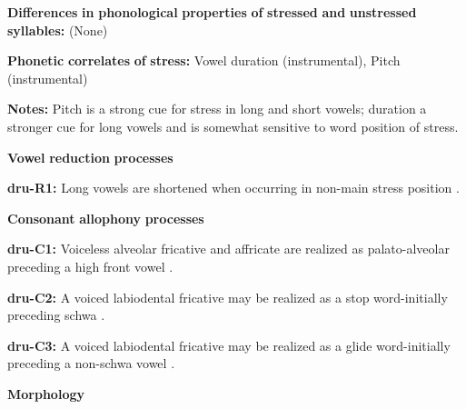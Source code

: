 \documentclass[output=paper]{langsci/langscibook}
\begin{document}
\begin{styleBody}
\textbf{Differences} \textbf{in} \textbf{phonological} \textbf{properties} \textbf{of} \textbf{stressed} \textbf{and} \textbf{unstressed} \textbf{syllables:} (None)
\end{styleBody}

\begin{styleBody}
\textbf{Phonetic} \textbf{correlates} \textbf{of} \textbf{stress:} Vowel duration (instrumental), Pitch (instrumental)
\end{styleBody}

\begin{styleBody}
\textbf{Notes:} Pitch is a strong cue for stress in long and short vowels; duration a stronger cue for long vowels and is somewhat sensitive to word position of stress.
\end{styleBody}

\begin{styleBody}
\textbf{Vowel} \textbf{reduction} \textbf{processes}
\end{styleBody}

\begin{styleBody}
\textbf{dru-R1:} Long vowels are shortened when occurring in non-main stress position \citep[257]{Chen2006}.
\end{styleBody}

\begin{styleBody}
\textbf{Consonant} \textbf{allophony} \textbf{processes}
\end{styleBody}

\begin{styleBody}
\textbf{dru-C1:} Voiceless alveolar fricative and affricate are realized as palato-alveolar preceding a high front vowel \citep[230]{Chen2006}.
\end{styleBody}

\begin{styleBody}
\textbf{dru-C2:} A voiced labiodental fricative may be realized as a stop word-initially preceding schwa \citep[227]{Chen2006}.
\end{styleBody}

\begin{styleBody}
\textbf{dru-C3:} A voiced labiodental fricative may be realized as a glide word-initially preceding a non-schwa vowel \citep[227]{Chen2006}.
\end{styleBody}

\begin{styleBody}
\textbf{Morphology}
\end{styleBody}
\end{document}
